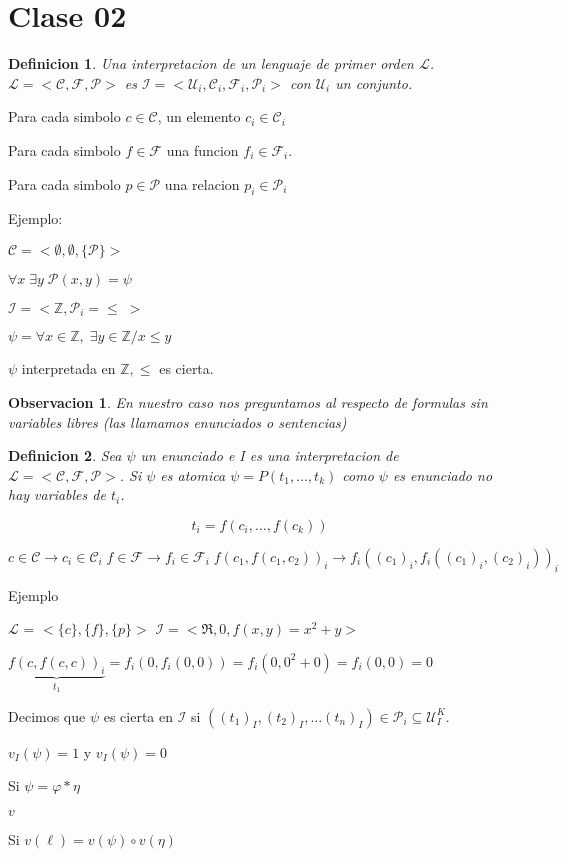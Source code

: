 \documentclass{article}
\newtheorem{definition}{Definicion}
\newtheorem{observation}{Observacion}
\begin{document}
\section{Clase 02}

\begin{definition}
Una interpretacion de un lenguaje de primer orden $\mathcal{L}$. $\mathcal{L} = <\mathcal{C}, \mathcal{F}, \mathcal{P}>$ es $\mathcal{I} = <\mathcal{U}_i, \mathcal{C}_i, \mathcal{F}_i, \mathcal{P}_i>$ con $\mathcal{U}_i$ un conjunto. 
\end{definition}

Para cada simbolo $c \in \mathcal{C}$, un elemento $c_i \in \mathcal{C}_i$ 

Para cada simbolo $f \in \mathcal{F}$ una funcion $f_i \in \mathcal{F}_i$. 

Para cada simbolo $p \in \mathcal{P}$ una relacion $p_i \in \mathcal{P}_i$

Ejemplo:

$\mathcal{C} = <\emptyset, \emptyset, \{\mathcal{P}\}>$ 

$\forall x \; \exists y \; \mathcal{P}(x, y) = \psi$

$\mathcal{I} = <\mathds{Z}, \mathcal{P}_i = \leq \;>$

$\psi = \forall x \in \mathds{Z}, \; \exists y \in \mathds{Z} / x \leq y$

$\psi$ interpretada en $\mathds{Z}, \leq$ es cierta.

\begin{observation}
En nuestro caso nos preguntamos al respecto de formulas \textit{sin} \textit{variables libres} (las llamamos enunciados o sentencias) 
\end{observation}

\begin{definition}
Sea $\psi$ un enunciado e I es una interpretacion de $\mathcal{L} = <\mathcal{C}, \mathcal{F}, \mathcal{P}>$. Si $\psi$ es atomica $\psi = P(t_1, \ldots, t_k)$ como $\psi$ es enunciado no hay variables de $t_i$.

\[
	t_i = f(c_i, \ldots, f(c_k))	
\]

\[
	c \in \mathcal{C} \rightarrow c_i \in \mathcal{C}_i \;
	f \in \mathcal{F} \rightarrow f_i \in \mathcal{F}_i \;
	f(c_1, f(c_1, c_2))_i \rightarrow f_i((c_1)_i, f_i((c_1)_i, (c_2)_i))_i
\]
\end{definition}

Ejemplo 

$\mathcal{L}$ = $<\{c\}, \{f\}, \{p\}>$ $\mathcal{I} = <\Re, 0, f(x, y) = x^2 + y>$

$\underbrace{f(c, f(c, c))_i}_{t_1} = f_i(0, f_i(0,0)) = f_i(0, 0^2 + 0) = f_i(0, 0) = 0$

Decimos que $\psi$ es cierta en $\mathcal{I}$ si $((t_1)_I, (t_2)_I, \ldots (t_n)_I) \in \mathcal{P}_i \subseteq \mathcal{U}^{K}_{I}$. 

$v_I(\psi) = 1 $ y $v_I(\psi) = 0$

Si $\psi = \varphi * \eta$

$v$


Si $v(\ell) = v(\psi) \circ v(\eta)$
\end{document}
